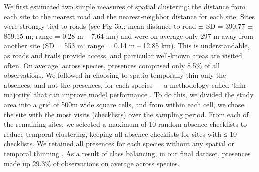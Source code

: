 We first estimated two simple measures of spatial clustering: the distance from each site to the nearest road \citep[road data from OpenStreetMap:][]{openstreetmapcontributors2017} and the nearest-neighbor distance for each site.
Sites were strongly tied to roads (see Fig 3a.; mean distance to road ± SD = 390.77 ± 859.15 m; range = 0.28 m -- 7.64 km) and were on average only 297 m away from another site (SD = 553 m; range = 0.14 m -- 12.85 km).
This is understandable, as roads and trails provide access, and particular well-known areas are visited often.
On average, across species, presences comprised only 8.5\% of all observations.
We followed \textcite{steen2021} in choosing to spatio-temporally thin only the absences, and not the presences, for each species --- a methodology called `thin majority' that can improve model performance \citep{steen2021}.
To do this, we divided the study area into a grid of 500m wide square cells, and from within each cell, we chose the site with the most visits (checklists) over the sampling period.
From each of the remaining sites, we selected a maximum of 10 random absence checklists to reduce temporal clustering, keeping all absence checklists for sites with ≤ 10 checklists.
We retained all presences for each species without any spatial or temporal thinning \citep{steen2021}.
As a result of class balancing, in our final dataset, presences made up 29.3\% of observations on average across species.

